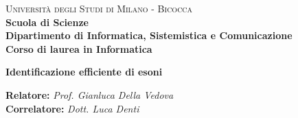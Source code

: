 \documentclass[a4paper,12pt, oneside]{book}
\begin{document}
{} 
\begin{titlepage}
  

  \noindent
  \begin{minipage}[t]{0.19\textwidth}
  \end{minipage}
  \begin{minipage}[t]{0.81\textwidth}
    {
      {\textsc{Università degli Studi di Milano - Bicocca}} \\
      \textbf{Scuola di Scienze} \\
      \textbf{Dipartimento di Informatica, Sistemistica e Comunicazione} \\
      \textbf{Corso di laurea in Informatica} \\
      \par
    }
  \end{minipage}
  
  \vspace{40mm}
  
  \begin{center}
    {\LARGE{
        \textbf{Identificazione efficiente di esoni}}}
  \end{center}
  
  \vspace{50mm}

  \noindent
  {\large \textbf{Relatore:} \textit{Prof. Gianluca Della Vedova} } \\

  \noindent
  {\large \textbf{Correlatore:} \textit{Dott. Luca Denti}}

  
  \vspace{15mm}


\end{titlepage}
\end{document}
